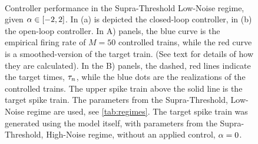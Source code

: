  
\begin{figure}[htp]
\begin{center}
\\
  \caption[Controller simulations for Supra-Threshold Low-Noise
regime]{Controller performance in the Supra-Threshold Low-Noise regime,
  given $\alpha \in [-2,2]$.
  In (a) is depicted the closed-loop controller, in (b) the open-loop
  controller.
  In A) panels, the blue curve is the empirical firing
  rate of $M=50$ controlled trains, while the red curve is a
  smoothed-version of the target train. 
  (See text for details of how they are calculated). 
  In the B) panels, the dashed, red lines indicate the target times,
  ${\tau}_n$, while the blue dots are the realizations of the controlled trains.  
  The upper spike train above the solid line is the target spike train.
  The parameters from the Supra-Threshold, Low-Noise regime are used, see
  \cref{tab:regimes}. 
  The target spike train was generated
  using the model itself, with parameters from the Supra-Threshold, High-Noise regime, without an applied
  control, $\alpha=0$.
  } 
  \label{fig:targettrain_lownoise} 
\end{center} 
\end{figure}

